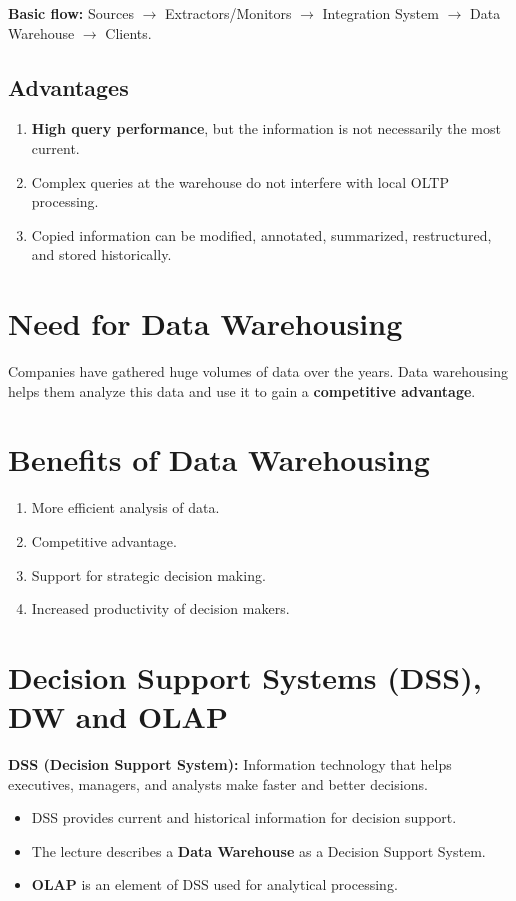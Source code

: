 \documentclass[12pt]{article}
\begin{document}
\textbf{Basic flow:} Sources $\rightarrow$ Extractors/Monitors $\rightarrow$ Integration System $\rightarrow$ Data Warehouse $\rightarrow$ Clients.

\subsection{Advantages}

\begin{enumerate}
    \item \textbf{High query performance}, but the information is not necessarily the most current.
    \item Complex queries at the warehouse do not interfere with local OLTP processing.
    \item Copied information can be modified, annotated, summarized, restructured, and stored historically.
\end{enumerate}

\section{Need for Data Warehousing}

Companies have gathered huge volumes of data over the years. Data warehousing helps them analyze this data and use it to gain a \textbf{competitive advantage}.

\section{Benefits of Data Warehousing}

\begin{enumerate}
    \item More efficient analysis of data.
    \item Competitive advantage.
    \item Support for strategic decision making.
    \item Increased productivity of decision makers.
\end{enumerate}

\section{Decision Support Systems (DSS), DW and OLAP}

\textbf{DSS (Decision Support System):} Information technology that helps executives, managers, and analysts make faster and better decisions.

\begin{itemize}
    \item DSS provides current and historical information for decision support.
    \item The lecture describes a \textbf{Data Warehouse} as a Decision Support System.
    \item \textbf{OLAP} is an element of DSS used for analytical processing.
\end{itemize}
\end{document}
